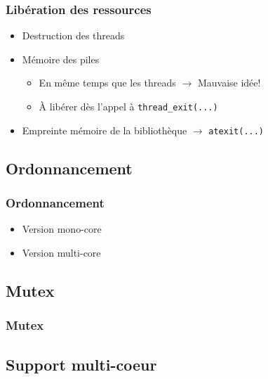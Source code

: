 \documentclass{beamer}
\begin{document}
\begin{frame}[containsverbatim]
  \frametitle{Libération des ressources}
  \begin{itemize}
  \item Destruction des threads
  \item Mémoire des piles
    \begin{itemize}
    \item En même temps que les threads $\rightarrow $ Mauvaise idée!
    \item À libérer dès l'appel à \verb!thread_exit(...)!
    \end{itemize}
  \item Empreinte mémoire de la bibliothèque
    $\rightarrow $ \verb!atexit(...)!
  \end{itemize}
\end{frame}

\subsection{Ordonnancement}

\begin{frame}
  \frametitle{Ordonnancement}
  \begin{itemize}
    \item Version mono-core
    \item Version multi-core
  \end{itemize}
\end{frame}

\subsection{Mutex}

\begin{frame}
  \frametitle{Mutex}
\end{frame}

\subsection{Support multi-coeur}
\end{document}
